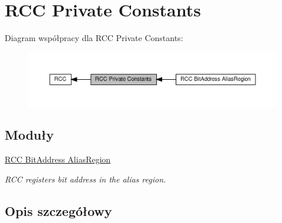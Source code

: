 \hypertarget{group___r_c_c___private___constants}{}\section{R\+CC Private Constants}
\label{group___r_c_c___private___constants}
Diagram współpracy dla R\+CC Private Constants\+:\nopagebreak
\begin{figure}[H]
\begin{center}
\leavevmode
\includegraphics[width=350pt]{group___r_c_c___private___constants}
\end{center}
\end{figure}
\subsection*{Moduły}
\begin{DoxyCompactItemize}
\item 
\hyperlink{group___r_c_c___bit_address___alias_region}{R\+C\+C Bit\+Address Alias\+Region}
\begin{DoxyCompactList}\small\item\em R\+CC registers bit address in the alias region. \end{DoxyCompactList}\end{DoxyCompactItemize}


\subsection{Opis szczegółowy}
